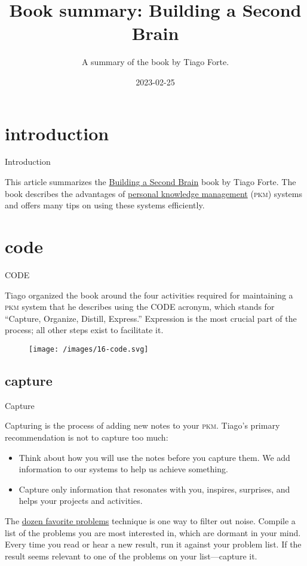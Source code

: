 \documentclass{article}
\title{Book summary: Building a Second Brain}
\subtitle{A summary of the book by Tiago Forte.}
\date{2023-02-25}
\begin{document}
\section{introduction}{Introduction}

This article summarizes the \href{https://www.buildingasecondbrain.com/}{Building a Second Brain} book by Tiago Forte.
The book describes the advantages of \href{https://en.wikipedia.org/wiki/Personal_knowledge_management}{personal knowledge management} (\textsc{pkm}) systems and offers many tips on using these systems efficiently.

\section{code}{CODE}

Tiago organized the book around the four activities required for maintaining a \textsc{pkm} system that he describes using the CODE acronym, which stands for ``Capture, Organize, Distill, Express.''
Expression is the most crucial part of the process; all other steps exist to facilitate it.

\begin{figure}[grayscale-diagram]
  \texttt{[image: /images/16-code.svg]}
\end{figure}

\subsection{capture}{Capture}

Capturing is the process of adding new notes to your \textsc{pkm}.
Tiago's primary recommendation is not to capture too much:

\begin{itemize}
  \item Think about how you will use the notes before you capture them. We add information to our systems to help us achieve something.
  \item
    Capture only information that resonates with you, inspires, surprises, and helps your projects and activities.
\end{itemize}

The \href{https://fortelabs.com/blog/12-favorite-problems-how-to-spark-genius-with-the-power-of-open-questions/}{dozen favorite problems} technique is one way to filter out noise.
Compile a list of the problems you are most interested in, which are dormant in your mind.
Every time you read or hear a new result, run it against your problem list.
If the result seems relevant to one of the problems on your list---capture it.
\end{document}

